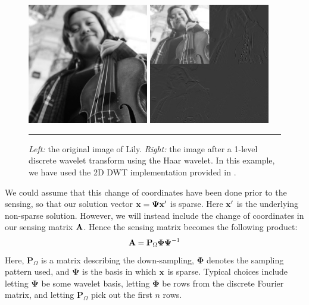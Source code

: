 \begin{figure}[t]
	\centering
	\includegraphics[width=0.47\textwidth]{figs/lily.jpg}
	\hspace{.039\textwidth}
	\includegraphics[width=0.47\textwidth]{figs/lily_wavelet.jpg}
	\caption{\textit{Left:} the original image of Lily. \textit{Right:} the image after a 1-level discrete wavelet transform using the Haar wavelet. In this example, we have used the 2D DWT implementation provided in \cite{ryan16applinalg}.}
	\label{fig:dwt_sparsifying}
	\vspace{4pt}\hrule
\end{figure}

We could assume that this change of coordinates have been done prior to the sensing, so that our solution vector $ \mathbf{x} = \mathbf{\Psi}\mathbf{x}' $ is sparse. Here $ \mathbf{x}' $ is the underlying non-sparse solution. However, we will instead include the change of coordinates in our sensing matrix $ \mathbf{A} $. Hence the sensing matrix becomes the following product:
\begin{equation}
	\label{eq:sensingmatrix_composition}
	\mathbf{A} = \mathbf{P}_{\Omega}\mathbf{\Phi}\mathbf{\Psi}^{-1}
\end{equation}
Here, $ \mathbf{P}_{\Omega} $ is a matrix describing the down-sampling, $ \mathbf{\Phi} $ denotes the sampling pattern used, and $ \mathbf{\Psi} $ is the basis in which $ \mathbf{x} $ is sparse. Typical choices include letting $ \mathbf{\Psi} $ be some wavelet basis, letting $ \mathbf{\Phi} $ be rows from the discrete Fourier matrix, and letting $ \mathbf{P}_{\Omega} $ pick out the first $ n $ rows.

